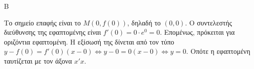 \begin{thema}{Β}
\begin{erwthma}
\item Το σημείο επαφής είναι το $M(0, f(0))$, δηλαδή το $(0, 0)$.
Ο συντελεστής διεύθυνσης της εφαπτομένης είναι $f'(0) = 0 \cdot e^0 = 0$. Επομένως, πρόκειται για οριζόντια εφαπτομένη.
Η εξίσωσή της δίνεται από τον τύπο $y - f(0) = f'(0)(x-0) \Leftrightarrow y - 0 = 0(x-0) \Leftrightarrow y = 0$. 
Οπότε η εφαπτομένη ταυτίζεται με τον άξονα $x'x$.
\end{erwthma}
\end{thema}
